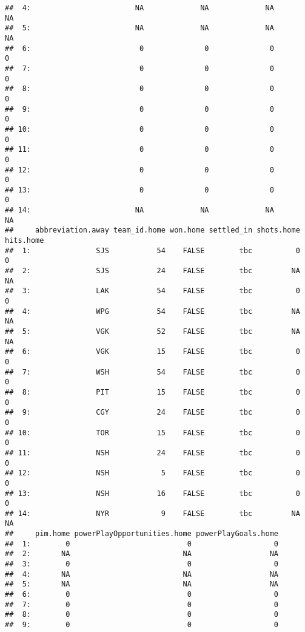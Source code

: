 \documentclass[
]{article}
\begin{document}
\begin{verbatim}
##  4:                        NA             NA             NA           NA
##  5:                        NA             NA             NA           NA
##  6:                         0              0              0            0
##  7:                         0              0              0            0
##  8:                         0              0              0            0
##  9:                         0              0              0            0
## 10:                         0              0              0            0
## 11:                         0              0              0            0
## 12:                         0              0              0            0
## 13:                         0              0              0            0
## 14:                        NA             NA             NA           NA
##     abbreviation.away team_id.home won.home settled_in shots.home hits.home
##  1:               SJS           54    FALSE        tbc          0         0
##  2:               SJS           24    FALSE        tbc         NA        NA
##  3:               LAK           54    FALSE        tbc          0         0
##  4:               WPG           54    FALSE        tbc         NA        NA
##  5:               VGK           52    FALSE        tbc         NA        NA
##  6:               VGK           15    FALSE        tbc          0         0
##  7:               WSH           54    FALSE        tbc          0         0
##  8:               PIT           15    FALSE        tbc          0         0
##  9:               CGY           24    FALSE        tbc          0         0
## 10:               TOR           15    FALSE        tbc          0         0
## 11:               NSH           24    FALSE        tbc          0         0
## 12:               NSH            5    FALSE        tbc          0         0
## 13:               NSH           16    FALSE        tbc          0         0
## 14:               NYR            9    FALSE        tbc         NA        NA
##     pim.home powerPlayOpportunities.home powerPlayGoals.home
##  1:        0                           0                   0
##  2:       NA                          NA                  NA
##  3:        0                           0                   0
##  4:       NA                          NA                  NA
##  5:       NA                          NA                  NA
##  6:        0                           0                   0
##  7:        0                           0                   0
##  8:        0                           0                   0
##  9:        0                           0                   0

\end{verbatim}
\end{document}
